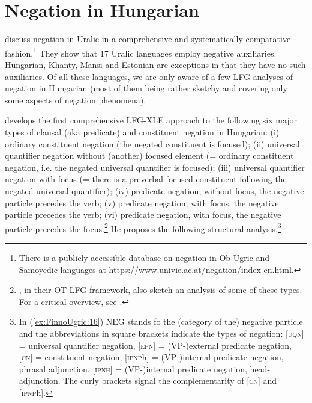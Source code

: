 \documentclass[output=paper,hidelinks]{langscibook}
\begin{document}
\section{Negation in Hungarian}
\label{sec:FinnoUgric:4}
\largerpage
\citet{MiestamoTammWagnerNagy2015} discuss negation in Uralic in a
comprehensive and systematically comparative fashion.\footnote{There
is a publicly accessible database on negation in Ob-Ugric and
Samoyedic languages at
\url{https://www.univie.ac.at/negation/index-en.html}.} They show that 17
Uralic languages employ negative auxiliaries. Hungarian, Khanty, Mansi
and Estonian are exceptions in that they have no such auxiliaries. Of
all these languages, we are only aware of a few LFG analyses of
negation in Hungarian (most of them being rather sketchy and covering
only some aspects of negation phenomena).

\citet{Laczko2014a} develops
the first comprehensive LFG{}-XLE approach to the following six major
types of clausal (aka predicate) and constituent negation in
Hungarian: (i) ordinary constituent negation (the negated constituent
is focused); (ii) universal quantifier negation without (another)
focused element  (= ordinary constituent negation, i.e. the negated
universal quantifier is focused); (iii) universal quantifier negation
with focus (= there is a preverbal focused constituent following the
negated universal quantifier); (iv) predicate negation, without focus,
the negative particle precedes the verb; (v) predicate negation, with
focus, the negative particle precedes the verb; (vi) predicate
negation, with focus, the negative particle precedes the
focus.\footnote{\citet{PayneChisarik2000}, in their OT-LFG framework,
also sketch an analysis of some of these types. For a critical overview, see \citet{Laczko2014a}.} He proposes the
following structural analysis.\footnote{In (\ref{ex:FinnoUgric:16}) NEG stands fo the (category of the) negative particle and the abbreviations in square
brackets indicate the types of negation: [\textsc{uqn}] = universal
quantifier negation, [\textsc{epn}] = \mbox{(VP-)external} predicate negation,
[\textsc{cn}] = constituent negation, [\textsc{ipnp}h] = (VP-)internal
predicate negation, phrasal adjunction, [\textsc{ipnh}] = (VP-)internal
predicate negation, head-adjunction. The curly brackets signal the
complementarity of [\textsc{cn}] and [\textsc{ipnp}h].}
\end{document}
